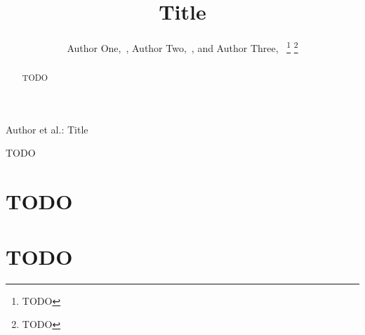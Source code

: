 \documentclass[letterpaper,journal]{IEEEtran}
\begin{document}


\title{Title}

\author{%
Author One,~,
Author Two,~,
and Author Three,~%
\thanks{TODO}%
\thanks{TODO}}


\markboth{}%
{Author \MakeLowercase{et al.}: Title}

\maketitle


\begin{abstract}
TODO
\end{abstract}


\begin{IEEEkeywords}
TODO
\end{IEEEkeywords}


\section{TODO}\label{sec:1}
\cite{bae2023ctleising}


\appendices
\section{TODO}\label{app:1}






\nocite{*}




\end{document}
